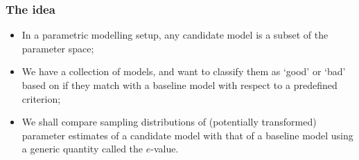 \documentclass[handout,10pt]{beamer}
\begin{document}
%
%
%


\begin{frame}
\frametitle{The idea}

\begin{itemize}
\item In a parametric modelling setup, any candidate model is a subset of the parameter space;
\vspace{1em}

\item We have a collection of models, and want to classify them as `good' or `bad' based on if they match with a baseline model with respect to a predefined criterion;
\vspace{1em}

\item We shall compare sampling distributions of (potentially transformed) parameter estimates of a candidate model with that of a baseline model using a generic quantity called the {\colbbf $e$-value}.
\vspace{1em}

\end{itemize}
\end{frame}

\end{document}
